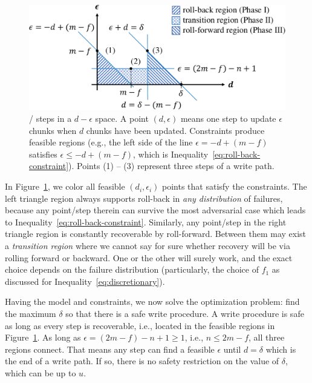 \begin{figure}[!t]
  \centering
  \includegraphics[width=\linewidth]{figures/d-e-space}
  \caption{\protocol/ steps in a $d-\epsilon$ space. A point $(d, \epsilon)$
means one step to update $\epsilon$ chunks when $d$ chunks have been updated.
Constraints produce feasible regions (e.g., the left side of the line $\epsilon
= -d + (m - f)$ satisfies $\epsilon \le -d + (m - f)$, which is
Inequality~\ref{eq:roll-back-constraint}). Points (1) -- (3) represent three
steps of a write path. \vspace{-1em}}
  \label{fig:d-e-space}
\end{figure}

In Figure~\ref{fig:d-e-space}, we color all feasible $(d_i, \epsilon_i)$ points
that satisfy the constraints. The left triangle region always supports
roll-back in \emph{any distribution} of failures, because any point/step
therein can survive the most adversarial case which leads to
Inequality~\ref{eq:roll-back-constraint}. Similarly, any point/step in the right triangle region is
constantly recoverable by roll-forward. Between them may exist a
\emph{transition region} where we cannot say for sure whether recovery will be via rolling forward or backward. 
One or the other will surely work, and the exact choice depends on the failure distribution (particularly, the choice of $f_1$ as
discussed for Inequality~\ref{eq:discretionary}).

Having the model and constraints, we now solve the optimization problem: find the
maximum $\delta$ so that there is a safe write procedure.  A write procedure is
safe as long as every step is recoverable, i.e., located in the
feasible regions in Figure~\ref{fig:d-e-space}.  As long as $\epsilon = (2m -
f) - n + 1 \ge 1$, i.e., $n \le 2m - f$, all three regions connect. That means
any step can find a feasible $\epsilon$ until $d = \delta$ which is the end of
a write path. If so, there is no safety restriction on the value of $\delta$,
which can be up to $u$.

